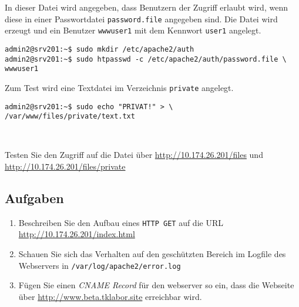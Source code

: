In dieser Datei wird angegeben, dass Benutzern der Zugriff erlaubt wird, wenn
diese in einer Passwortdatei \texttt{password.file} angegeben sind. Die Datei
wird erzeugt und ein Benutzer \texttt{wwwuser1} mit dem Kennwort \texttt{user1}
angelegt.

\begin{lstlisting}
admin2@srv201:~$ sudo mkdir /etc/apache2/auth
admin2@srv201:~$ sudo htpasswd -c /etc/apache2/auth/password.file \
wwwuser1
\end{lstlisting}

Zum Test wird eine Textdatei im Verzeichnis \texttt{private} angelegt.

\begin{lstlisting}
admin2@srv201:~$ sudo echo "PRIVAT!" > \
/var/www/files/private/text.txt
\end{lstlisting}\

Testen Sie den Zugriff auf die Datei über
\url{http://10.174.26.201/files} und \url{http://10.174.26.201/files/private}

\subsection{Aufgaben}
\begin{enumerate}
  \item Beschreiben Sie den Aufbau eines \texttt{HTTP GET} auf die URL
  \url{http://10.174.26.201/index.html}
  \item Schauen Sie sich das Verhalten auf den geschützten Bereich im Logfile
  des Webservers in \texttt{/var/log/apache2/error.log}
  \item Fügen Sie einen \textit{CNAME Record} für den webserver so ein, dass die
  Webseite über \url{http://www.beta.tklabor.site} erreichbar wird.
\end{enumerate}